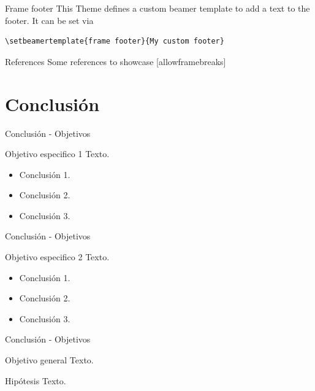 \documentclass[10pt]{beamer}
\begin{document}
{%
\begin{frame}[fragile]{Frame footer}
    This Theme defines a custom beamer template to add a text to the footer. It can be set via
    \begin{verbatim}\setbeamertemplate{frame footer}{My custom footer}\end{verbatim}
\end{frame}
}

\begin{frame}{References}
  Some references to showcase [allowframebreaks] \cite{knuth92,ConcreteMath,Simpson,Er01,greenwade93}
\end{frame}

\section{Conclusión}

\begin{frame}{Conclusión - Objetivos}
    \begin{exampleblock}{Objetivo especifico 1}
        Texto.
    \end{exampleblock}
    \begin{itemize}
        \item Conclusión 1.
        \item Conclusión 2.
        \item Conclusión 3.
    \end{itemize}
\end{frame}

\begin{frame}{Conclusión - Objetivos}
    \begin{exampleblock}{Objetivo especifico 2}
        Texto.
    \end{exampleblock}
    \begin{itemize}
        \item Conclusión 1.
        \item Conclusión 2.
        \item Conclusión 3.
    \end{itemize}
\end{frame}


\begin{frame}{Conclusión - Objetivos}
    \begin{block}{Objetivo general}
     Texto.
    \end{block}
    \begin{block}{Hipótesis}
    Texto.
    \end{block}
\end{frame}
\end{document}

